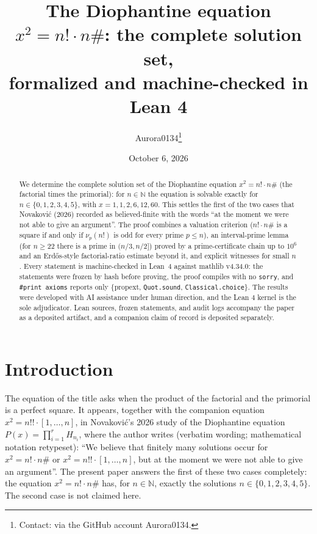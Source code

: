 \documentclass[11pt]{article}
\title{The Diophantine equation $x^2 = n! \cdot n\#$: the complete solution
set,\\ formalized and machine-checked in Lean 4}
\author{Aurora0134\thanks{Contact: via the GitHub account Aurora0134.}}
\date{October 6, 2026}
\theoremstyle{definition}
\begin{document}
\maketitle

\begin{abstract}
We determine the complete solution set of the Diophantine equation
$x^2 = n! \cdot n\#$ (the factorial times the primorial): for
$n \in \mathbb{N}$ the equation is solvable exactly for
$n \in \{0,1,2,3,4,5\}$, with $x = 1, 1, 2, 6, 12, 60$. This settles the
first of the two cases that Novakovi\'c (2026) recorded as believed-finite
with the words ``at the moment we were not able to give an argument''. The
proof combines a valuation criterion ($n! \cdot n\#$ is a square if and only
if $\nu_p(n!)$ is odd for every prime $p \le n$), an interval-prime lemma (for
$n \ge 22$ there is a prime in $(n/3, n/2]$) proved by a prime-certificate
chain up to $10^{6}$ and an Erd\H{o}s-style factorial-ratio estimate beyond
it, and explicit witnesses for small $n$. Every statement is machine-checked
in Lean~4 against mathlib v4.34.0: the statements were frozen by hash before
proving, the proof compiles with no \texttt{sorry}, and
\texttt{\#print axioms} reports only \{propext, \texttt{Quot.sound},
\texttt{Classical.choice}\}. The results were developed with AI assistance
under human direction, and the Lean 4 kernel is the sole adjudicator. Lean
sources, frozen statements, and audit logs accompany the paper as a deposited
artifact, and a companion claim of record is deposited separately.
\end{abstract}

\section{Introduction}\label{sec:intro}

The equation of the title asks when the product of the factorial and the
primorial is a perfect square. It appears, together with the companion
equation $x^2 = n!! \cdot [1, \ldots, n]$, in Novakovi\'c's 2026 study
\cite{novakovic2026} of the Diophantine equation
$P(x) = \prod_{i=1}^{r} H_{n_i}$, where the author writes (verbatim wording;
mathematical notation retypeset): ``We believe that finitely many solutions
occur for $x^2 = n! \cdot n\#$ or $x^2 = n!! \cdot [1, \ldots, n]$, but at
the moment we were not able to give an argument''. The present paper answers
the first of these two cases completely: the equation
$x^2 = n! \cdot n\#$ has, for $n \in \mathbb{N}$, exactly the solutions
$n \in \{0,1,2,3,4,5\}$. The second case is not claimed here.
\end{document}
